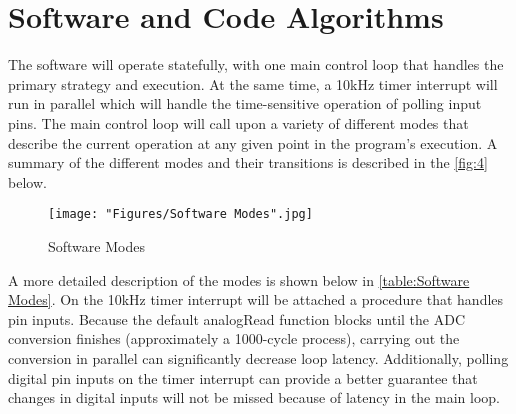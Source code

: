 \documentclass[11pt, oneside]{article} %
\begin{document}

\section{Software and Code Algorithms}	
The software will operate statefully, with one main control loop that handles the primary strategy and execution. At the same time, a 10kHz timer interrupt will run in parallel which will handle the time-sensitive operation of polling input pins.
The main control loop will call upon a variety of different modes that describe the current operation at any given point in the program's execution. A summary of the different modes and their transitions is described in the \autoref{fig:4} below.
\begin{figure}[h]
	\centering
	\texttt{[image: "Figures/Software Modes".jpg]}
	\caption[Software Modes]{Software Modes}
	\label{fig:4}
\end{figure}

A more detailed description of the modes is shown below in \autoref{table:Software Modes}.
On the 10kHz timer interrupt will be attached a procedure that handles pin inputs. Because the default analogRead function blocks until the ADC conversion finishes (approximately a 1000-cycle process), carrying out the conversion in parallel can significantly decrease loop latency. Additionally, polling digital pin inputs on the timer interrupt can provide a better guarantee that changes in digital inputs will not be missed because of latency in the main loop.
\end{document}

